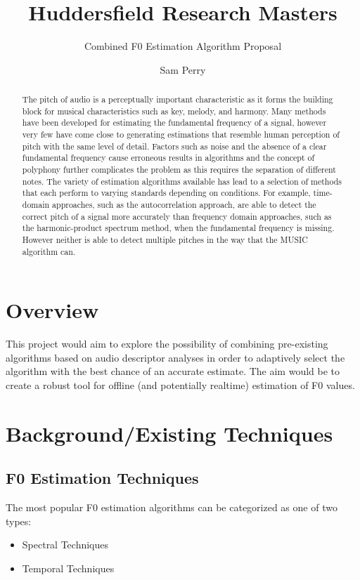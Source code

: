 \documentclass{scrartcl}
\begin{document}
    \title{Huddersfield Research Masters}
    \subtitle{Combined F0 Estimation Algorithm Proposal}
    \author{Sam Perry}
    \date{}
    \maketitle

    \begin{abstract}
        The pitch of audio is a perceptually important characteristic as it
        forms the building block for musical characteristics such as key,
        melody, and harmony. Many methods have been developed for estimating
        the fundamental frequency of a signal, however very few have come close
        to generating estimations that resemble human perception of pitch with
        the same level of detail. Factors such as noise and the absence of a
        clear fundamental frequency cause erroneous results in algorithms and
        the concept of polyphony further complicates the problem as this
        requires the separation of different notes. The variety of estimation
        algorithms available has lead to a selection of methods that each
        perform to varying standards depending on conditions. For example,
        time-domain approaches, such as the autocorrelation approach, are able
        to detect the correct pitch of a signal more accurately than frequency
        domain approaches, such as the harmonic-product spectrum method, when
        the fundamental frequency is missing. However neither is able to detect
        multiple pitches in the way that the MUSIC algorithm can.  
    \end{abstract}

    \section{Overview}
    This project would aim to explore the possibility of combining pre-existing
    algorithms based on audio descriptor analyses in order to adaptively select
    the algorithm with the best chance of an accurate estimate. The aim would
    be to create a robust tool for offline (and potentially realtime)
    estimation of F0 values.

    \section{Background/Existing Techniques}
    \subsection{F0 Estimation Techniques}
    The most popular F0 estimation algorithms can be categorized as one of
    two types:
    \begin{itemize}
        \item Spectral Techniques
        \item Temporal Techniques
    \end{itemize}
\end{document}
